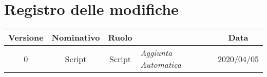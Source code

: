 \section*{Registro delle modifiche}
\renewcommand{\arraystretch}{1.8}

    \begin{longtable}{|c|c|c|p{3.8cm}|c|}
        \hline
        \rowcolor{header}
        \textbf{Versione} & \textbf{Nominativo} & \textbf{Ruolo} & \centering{\textbf{Descrizione}} & \textbf{Data} \\ 
        \hline 
        0 & Script & Script & \small{\textit{ Aggiunta Automatica }} & 2020/04/05 \\ 
        \hline
    \end{longtable}
